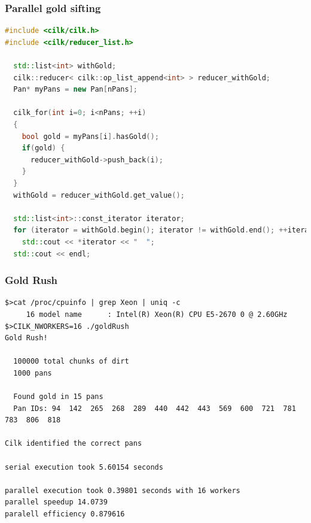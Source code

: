 \documentclass[fleqn,xcolor=table,10pt,final]{beamer}
\begin{document}
\begin{frame}[fragile]
  \frametitle{Parallel gold sifting}
  \begin{lstlisting}[language=C++,basicstyle=\scriptsize]
#include <cilk/cilk.h>
#include <cilk/reducer_list.h>

  std::list<int> withGold;
  cilk::reducer< cilk::op_list_append<int> > reducer_withGold;
  Pan* myPans = new Pan[nPans];

  cilk_for(int i=0; i<nPans; ++i)
  {
    bool gold = myPans[i].hasGold();
    if(gold) {
      reducer_withGold->push_back(i);
    }
  }
  withGold = reducer_withGold.get_value();

  std::list<int>::const_iterator iterator;
  for (iterator = withGold.begin(); iterator != withGold.end(); ++iterator)
    std::cout << *iterator << "  ";
  std::cout << endl;
  \end{lstlisting}
\end{frame}

\begin{frame}[fragile]
  \frametitle{Gold Rush}
  {\scriptsize
  \begin{verbatim}
$>cat /proc/cpuinfo | grep Xeon | uniq -c
     16 model name      : Intel(R) Xeon(R) CPU E5-2670 0 @ 2.60GHz
$>CILK_NWORKERS=16 ./goldRush
Gold Rush!

  100000 total chunks of dirt
  1000 pans

  Found gold in 15 pans
  Pan IDs: 94  142  265  268  289  440  442  443  569  600  721  781  783  806  818

Cilk identified the correct pans

serial execution took 5.60154 seconds

parallel execution took 0.39801 seconds with 16 workers
parallel speedup 14.0739
paralell efficiency 0.879616
  \end{verbatim}
}
\end{frame}
\end{document}
